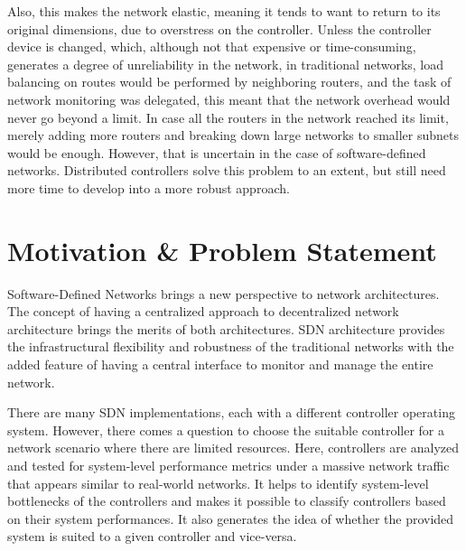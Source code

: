     Also, this makes the network elastic, meaning it tends to want to return to its original dimensions, due to overstress on the controller. Unless the controller device is changed, which, although not that expensive or time-consuming, generates a degree of unreliability in the network, in traditional networks, load balancing on routes would be performed by neighboring routers, and the task of network monitoring was delegated, this meant that the network overhead would never go beyond a limit. In case all the routers in the network reached its limit, merely adding more routers and breaking down large networks to smaller subnets would be enough. However, that is uncertain in the case of software-defined networks. Distributed controllers solve this problem to an extent, but still need more time to develop into a more robust approach.
    
    \section{Motivation \& Problem Statement}
    
    Software-Defined Networks brings a new perspective to network architectures. The concept of having a centralized approach to decentralized network architecture brings the merits of both architectures. SDN architecture provides the infrastructural flexibility and robustness of the traditional networks with the added feature of having a central interface to monitor and manage the entire network.
    
    There are many SDN implementations, each with a different controller operating system. However, there comes a question to choose the suitable controller for a network scenario where there are limited resources. Here, controllers are analyzed and tested for system-level performance metrics under a massive network traffic that appears similar to real-world networks. It helps to identify system-level bottlenecks of the controllers and makes it possible to classify controllers based on their system performances. It also generates the idea of whether the provided system is suited to a given controller and vice-versa.